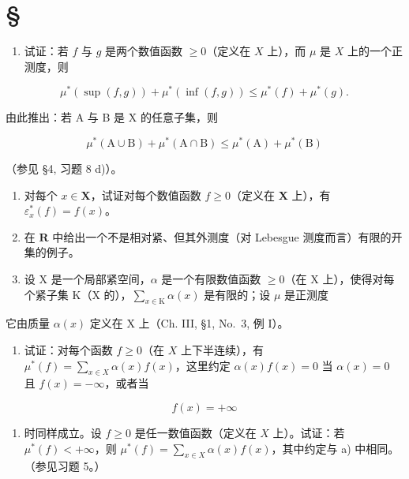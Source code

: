 \section*{\texorpdfstring{\S\CurrentExerciseGroup}{第{\CurrentExerciseGroup}节}}
{}

\begin{enumerate}
\def\labelenumi{\arabic{enumi})}
\tightlist
\item
  试证：若 \(f\) 与 \(g\) 是两个数值函数 \(\geqslant 0\)（定义在 \(X\) 上），而 \(\mu\) 是 \(X\) 上的一个正测度，则
\end{enumerate}

\[
\mu^ {*} (\sup (f, g)) + \mu^ {*} (\inf (f, g)) \leqslant \mu^ {*} (f) + \mu^ {*} (g).
\]

由此推出：若 A 与 B 是 X 的任意子集，则

\[
\mu^ {*} (\mathrm{A} \cup \mathrm{B}) + \mu^ {*} (\mathrm{A} \cap \mathrm{B}) \leqslant \mu^ {*} (\mathrm{A}) + \mu^ {*} (\mathrm{B})
\]

（参见 §4, 习题 8 d)）。

\begin{enumerate}
\def\labelenumi{\arabic{enumi})}
\setcounter{enumi}{1}
\item
  对每个 \(x \in \mathbf{X}\)，试证对每个数值函数 \(f \geqslant 0\)（定义在 \(\mathbf{X}\) 上），有 \(\varepsilon_x^*(f) = f(x)\)。
\item
  在 \(\mathbf{R}\) 中给出一个不是相对紧、但其外测度（对 Lebesgue 测度而言）有限的开集的例子。
\item
  设 \(\mathrm{X}\) 是一个局部紧空间，\(\alpha\) 是一个有限数值函数 \(\geqslant 0\)（在 \(\mathrm{X}\) 上），使得对每个紧子集 \(\mathrm{K}\)（\(\mathrm{X}\) 的），\(\sum_{x\in \mathrm{K}}\alpha (x)\) 是有限的；设 \(\mu\) 是正测度
\end{enumerate}

它由质量 \(\alpha(x)\) 定义在 X 上（Ch. III, §1, No.~3, 例 I）。

\begin{enumerate}
\def\labelenumi{\alph{enumi})}
\tightlist
\item
  试证：对每个函数 \(f \geqslant 0\)（在 \(X\) 上下半连续），有 \(\mu^{*}(f) = \sum_{x \in X} \alpha(x)f(x)\)，这里约定 \(\alpha(x)f(x) = 0\) 当 \(\alpha(x) = 0\) 且 \(f(x) = -\infty\)，或者当
\end{enumerate}

\[
f (x) = + \infty
\]

\begin{enumerate}
\def\labelenumi{\alph{enumi})}
\setcounter{enumi}{1}
\tightlist
\item
  时同样成立。设 \(f \geqslant 0\) 是任一数值函数（定义在 \(X\) 上）。试证：若 \(\mu^{*}(f) < +\infty\)，则 \(\mu^{*}(f) = \sum_{x \in X} \alpha(x)f(x)\)，其中约定与 a) 中相同。（参见习题 5。）
\end{enumerate}

